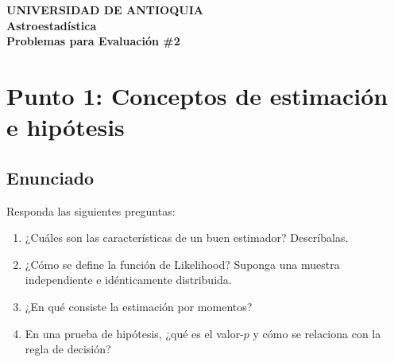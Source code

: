 \documentclass[12pt]{article}
\begin{document}
\begin{center}
    {\Large \textbf{UNIVERSIDAD DE ANTIOQUIA}}\\[0.2cm]
    {\large \textbf{Astroestadística}}\\[0.1cm]
    \textbf{Problemas para Evaluación \#2}
\end{center}

\vspace{0.5cm}

\section*{Punto 1: Conceptos de estimación e hipótesis}

\subsection*{Enunciado}
Responda las siguientes preguntas:
\begin{enumerate}[label=(\alph*)]
    \item ¿Cuáles son las características de un buen estimador? Descríbalas.
    \item ¿Cómo se define la función de Likelihood? Suponga una muestra independiente e idénticamente distribuida.
    \item ¿En qué consiste la estimación por momentos?
    \item En una prueba de hipótesis, ¿qué es el valor-$p$ y cómo se relaciona con la regla de decisión?
\end{enumerate}
\end{document}
